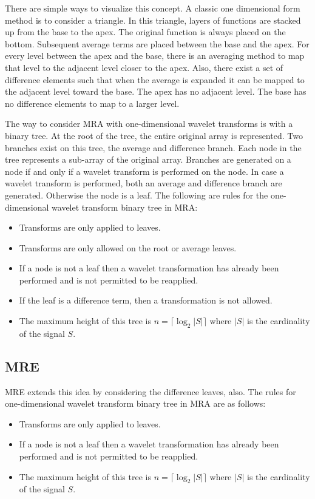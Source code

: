 There are simple ways to visualize this concept.  A classic one
dimensional form method is to consider a triangle.  In this triangle,
layers of functions are stacked up from the base to the apex.  The
original function is always placed on the bottom.  Subsequent average
terms are placed between the base and the apex.  For every level
between the apex and the base, there is an averaging method to map
that level to the adjacent level closer to the apex.  Also, there
exist a set of difference elements such that when the average is
expanded it can be mapped to the adjacent level toward the base.  The
apex has no adjacent level.  %
The base has no difference
elements to map to a larger level.

The way to consider MRA with one-dimensional wavelet transforms is with a binary tree.  At the root of the tree, the entire original array is represented.  Two branches exist on this tree, the average and difference branch.  Each node in the tree represents a sub-array of the original array.   Branches are generated on a node if and only if a wavelet transform is performed on the node.  In case a wavelet transform is performed, both an average and difference branch are generated.  Otherwise the node is a leaf.  The following are rules for the one-dimensional wavelet transform binary tree in MRA:
\begin{itemize}
\item Transforms are only applied to leaves.
\item Transforms are only allowed on the root or average leaves.
\item If a node is not a leaf then a wavelet transformation has already been performed and is not permitted to be reapplied.
\item If the leaf is a difference term, then a transformation is not allowed.
\item The maximum height of this tree is $n = \lceil \log_2 \left|S\right| \rceil$ where $\left|S\right|$ is the cardinality of the signal $S$.
\end{itemize}   

\subsection{MRE}

MRE extends this idea by considering the difference leaves, also.  The rules for one-dimensional wavelet transform binary tree in MRA are as follows: 
\begin{itemize}
\item Transforms are only applied to leaves.
\item If a node is not a leaf then a wavelet transformation has already been performed and is not permitted to be reapplied.
\item The maximum height of this tree is $n = \lceil \log_2 \left|S\right| \rceil$ where $\left|S\right|$ is the cardinality of the signal $S$.
\end{itemize}   

